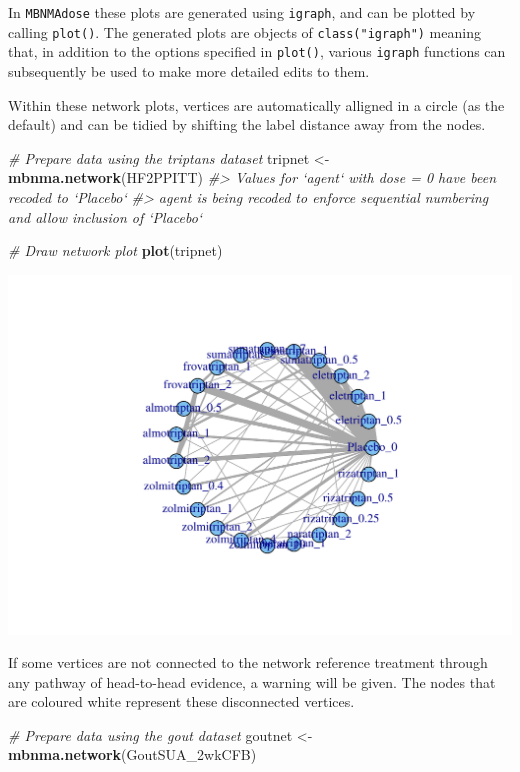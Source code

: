 \documentclass[]{article}
\newenvironment{Shaded}{\begin{snugshade}}{\end{snugshade}}
\newcommand{\CommentTok}[1]{\textcolor[rgb]{0.56,0.35,0.01}{\textit{#1}}}
\newcommand{\KeywordTok}[1]{\textcolor[rgb]{0.13,0.29,0.53}{\textbf{#1}}}
\newcommand{\NormalTok}[1]{#1}
\newcommand{\StringTok}[1]{\textcolor[rgb]{0.31,0.60,0.02}{#1}}
\begin{document}
In \texttt{MBNMAdose} these plots are generated using \texttt{igraph},
and can be plotted by calling \texttt{plot()}. The generated plots are
objects of \texttt{class("igraph")} meaning that, in addition to the
options specified in \texttt{plot()}, various \texttt{igraph} functions
can subsequently be used to make more detailed edits to them.

Within these network plots, vertices are automatically alligned in a
circle (as the default) and can be tidied by shifting the label distance
away from the nodes.

\begin{Shaded}
\begin{Highlighting}[]
\CommentTok{# Prepare data using the triptans dataset}
\NormalTok{tripnet <-}\StringTok{ }\KeywordTok{mbnma.network}\NormalTok{(HF2PPITT)}
\CommentTok{#> Values for `agent` with dose = 0 have been recoded to `Placebo`}
\CommentTok{#> agent is being recoded to enforce sequential numbering and allow inclusion of `Placebo`}

\CommentTok{# Draw network plot}
\KeywordTok{plot}\NormalTok{(tripnet)}
\end{Highlighting}
\end{Shaded}

\includegraphics{mbnmadose_files/figure-latex/unnamed-chunk-6-1.pdf}

If some vertices are not connected to the network reference treatment
through any pathway of head-to-head evidence, a warning will be given.
The nodes that are coloured white represent these disconnected vertices.

\begin{Shaded}
\begin{Highlighting}[]
\CommentTok{# Prepare data using the gout dataset}
\NormalTok{goutnet <-}\StringTok{ }\KeywordTok{mbnma.network}\NormalTok{(GoutSUA_2wkCFB)}
\end{Highlighting}
\end{Shaded}
\end{document}
